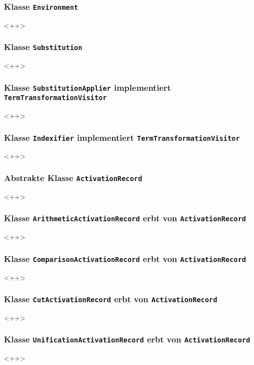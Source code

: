 \documentclass[parskip=full,11pt,twoside]{scrartcl}
\begin{document}
\subsubsection{Klasse \texttt{Environment}}
<++>

\subsubsection{Klasse \texttt{Substitution}}
<++>

\subsubsection{Klasse \texttt{SubstitutionApplier} implementiert \texttt{TermTransformationVisitor}}
<++>

\subsubsection{Klasse \texttt{Indexifier} implementiert \texttt{TermTransformationVisitor}}
<++>
\subsubsection{Abstrakte Klasse \texttt{ActivationRecord}}
<++>

\subsubsection{Klasse \texttt{ArithmeticActivationRecord} erbt von \texttt{ActivationRecord}}
<++>

\subsubsection{Klasse \texttt{ComparisonActivationRecord} erbt von \texttt{ActivationRecord}}
<++>

\subsubsection{Klasse \texttt{CutActivationRecord} erbt von \texttt{ActivationRecord}}
<++>

\subsubsection{Klasse \texttt{UnificationActivationRecord} erbt von \texttt{ActivationRecord}}
<++>
\end{document}
